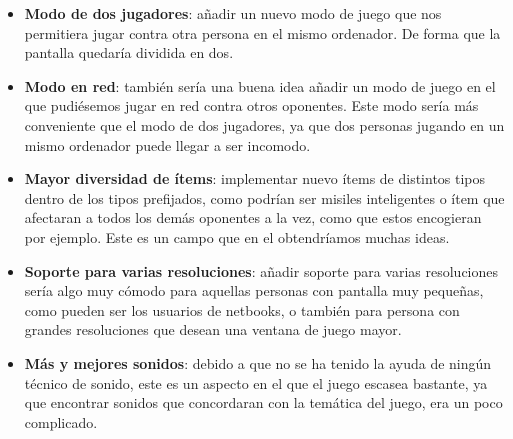 \begin{itemize}
    \item \textbf{Modo de dos jugadores}: añadir un nuevo modo de juego que nos permitiera jugar contra otra persona en el mismo
    ordenador. De forma que la pantalla quedaría dividida en dos.
    
    \item \textbf{Modo en red}: también sería una buena idea añadir un modo de
    juego en el que pudiésemos jugar en red contra otros
    oponentes. Este modo sería más conveniente que el modo de dos jugadores, ya que dos personas jugando en un mismo ordenador
    puede llegar a ser incomodo.
    
    \item \textbf{Mayor diversidad de ítems}: implementar nuevo ítems de distintos tipos dentro de los tipos prefijados, como 
    podrían ser misiles inteligentes o ítem que afectaran a todos los demás oponentes a la vez, como que estos encogieran por
    ejemplo. Este es un campo que en el obtendríamos muchas ideas.
    
    \item \textbf{Soporte para varias resoluciones}: añadir soporte para varias resoluciones sería algo muy cómodo para aquellas 
    personas con pantalla muy pequeñas, como pueden ser los usuarios de netbooks, o también para persona con grandes resoluciones
    que desean una ventana de juego mayor.
    
    
    \item \textbf{Más y mejores sonidos}: debido a que no se ha tenido la ayuda de ningún técnico de sonido, este es un aspecto en el que el
    juego escasea bastante, ya que encontrar sonidos que concordaran con la temática del juego, era un poco complicado.
\end{itemize}
